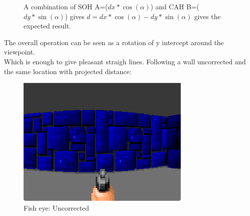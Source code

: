 \begin{figure}[H]
\centering
 
 \caption{A combination of SOH A=($dx * \cos(\alpha)$) and CAH B=($ dy * \sin(\alpha) $) gives $d = dx * \cos(\alpha) - dy * \sin(\alpha) $ gives the expected result.}
\end{figure}

The overall operation can be seen as a rotation of y intercept around the viewpoint.\\
 Which is enough to give pleasant straigh lines. Following a wall uncorrected and the same location with projected distance:\\
 \begin{figure}[H]
\centering
 \includegraphics[width=\textwidth]{screenshots/fish_eye/fish_eye.png}
  \caption{Fish eye: Uncorrected} 
 \end{figure}
 

